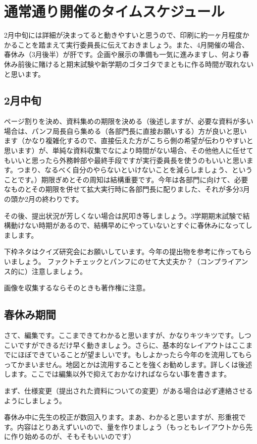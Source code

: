 \documentclass[dvipdfmx,jb5]{jreport}
\begin{document}
\section{通常通り開催のタイムスケジュール}
2月中旬には詳細が決まってると動きやすいと思うので、印刷に約一ヶ月程度かかることを踏まえて実行委員長に伝えておきましょう。また、4月開催の場合、春休み（3月後半）が肝です。企画や展示の準備も一気に進みますし、何より春休み前後に賭けると期末試験や新学期のゴタゴタでまともに作る時間が取れないと思います。

\subsection{2月中旬}
ページ割りを決め、資料集めの期限を決める（後述しますが、必要な資料が多い場合は、パンフ局長自ら集める（各部門長に直接お願いする）方が良いと思います（かなり複雑化するので、直接伝えた方がこちら側の希望が伝わりやすいと思います）が、単純な資料収集でなにより時間がない場合、その他他人に任せてもいいと思ったら外務幹部や最終手段ですが実行委員長を使うのもいいと思います。つまり、なるべく自分のやらないといけないことを減らしましょう、ということです。）期限ぎめとその周知は結構重要です。今年は各部門に向けて、必要なものとその期限を併せて拡大実行時に各部門長に配りました、それが多分3月の頭か2月の終わりです。

その後、提出状況が芳しくない場合は尻叩き等しましょう。3学期期末試験で結構動けない時期があるので、結構早めにやっていないとすぐに春休みになってしまします。

下枠ネタはクイズ研究会にお願いしています。今年の提出物を参考に作ってもらいましょう。
ファクトチェックとパンフにのせて大丈夫か？（コンプライアンス的に）注意しましょう。

画像を収集するならそのときも著作権に注意。

\subsection{春休み期間}
さて、編集です。ここまできてわかると思いますが、かなりキツキツです。しつこいですができるだけ早く動きましょう。さらに、基本的なレイアウトはここまでにほぼできていることが望ましいです。もしよかったら今年のを流用してもらってかまいません。地図とかは流用することを強くお勧めします。詳しくは後述します。ここでは編集以外で抑えておかなければならない事を書きます。

まず、仕様変更（提出された資料についての変更）がある場合は必ず連絡させるようにしましょう。

春休み中に先生の校正が数回入ります。まあ、わかると思いますが、形重視です。内容はとりあえずいいので、量を作りましょう（もっともレイアウトから先に作り始めるのが、そもそもいいのです）
\end{document}
